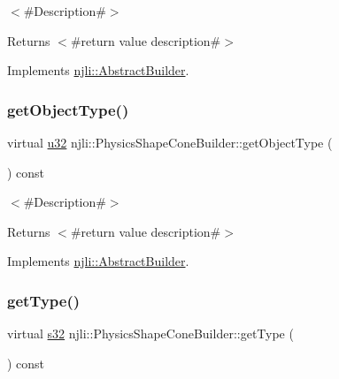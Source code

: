 $<$\#\+Description\#$>$

\begin{DoxyReturn}{Returns}
$<$\#return value description\#$>$ 
\end{DoxyReturn}


Implements \mbox{\hyperlink{classnjli_1_1_abstract_builder_a902f73ea78031b06aca183a417f3413b}{njli\+::\+Abstract\+Builder}}.

\mbox{\label{classnjli_1_1_physics_shape_cone_builder_afaf1daa40f05416842f5eb9f61e58608}} 
\subsubsection{\texorpdfstring{get\+Object\+Type()}{getObjectType()}}
{\footnotesize\ttfamily virtual \mbox{\hyperlink{_util_8h_a10e94b422ef0c20dcdec20d31a1f5049}{u32}} njli\+::\+Physics\+Shape\+Cone\+Builder\+::get\+Object\+Type (\begin{DoxyParamCaption}{ }\end{DoxyParamCaption}) const\hspace{0.3cm}{\ttfamily [virtual]}}

$<$\#\+Description\#$>$

\begin{DoxyReturn}{Returns}
$<$\#return value description\#$>$ 
\end{DoxyReturn}


Implements \mbox{\hyperlink{classnjli_1_1_abstract_builder_a0f2d344fcf697b167f4f2b1122b5fb33}{njli\+::\+Abstract\+Builder}}.

\mbox{\label{classnjli_1_1_physics_shape_cone_builder_a11ff6199b06423247720ecf8585d69bc}} 
\subsubsection{\texorpdfstring{get\+Type()}{getType()}}
{\footnotesize\ttfamily virtual \mbox{\hyperlink{_util_8h_aa62c75d314a0d1f37f79c4b73b2292e2}{s32}} njli\+::\+Physics\+Shape\+Cone\+Builder\+::get\+Type (\begin{DoxyParamCaption}{ }\end{DoxyParamCaption}) const\hspace{0.3cm}{\ttfamily [virtual]}}


